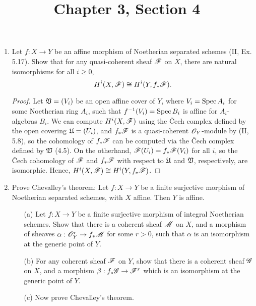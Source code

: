 \documentclass{article}
\title{Chapter 3, Section 4}
\begin{document}
\maketitle
\begin{enumerate} [label=\textbf{\arabic*.}, leftmargin=0em]

\item Let $f : X \to Y$ be an affine morphism of Noetherian separated schemes (II, Ex. 5.17).
Show that for any quasi-coherent sheaf $\mathscr{F}$ on $X$, there are natural isomorphisms for all $i \geq 0$,
\begin{equation*}
  H^i(X, \mathscr{F}) \cong H^i(Y, f_* \mathscr{F}).
\end{equation*}

\begin{proof}
  Let $\mathfrak{V} = (V_i)$ be an open affine cover of $Y$, where $V_i = \operatorname{Spec}{A_i}$ for some Noetherian ring $A_i$, such that $f^{-1}(V_i) = \operatorname{Spec}{B_i}$ is affine for $A_i$-algebras $B_i$.
  We can compute $H^i(X, \mathscr{F})$ using the Čech complex defined by the open covering $\mathfrak{U} = (U_i)$, and $f_*\mathscr{F}$ is a quasi-coherent $\mathscr{O}_Y$-module by (II, 5.8), so the cohomology of $f_*\mathscr{F}$ can be computed via the Čech complex defined by $\mathfrak{V}$ (4.5).
  On the otherhand, $\mathscr{F}(U_i) = f_*\mathscr{F}(V_i)$ for all $i$, so the Čech cohomology of $\mathscr{F}$ and $f_*\mathscr{F}$ with respect to $\mathfrak{U}$ and $\mathfrak{V}$, respectively, are isomorphic.
  Hence, $H^i(X, \mathscr{F}) \cong H^i(Y, f_*\mathscr{F})$.
\end{proof}

\item Prove Chevalley's theorem: Let $f : X \to Y$ be a finite surjective morphism of Noetherian separated schemes, with $X$ affine.
Then $Y$ is affine.
\begin{itemize}
  \item[(a)] Let $f : X \to Y$ be a finite surjective morphism of integral Noetherian schemes.
  Show that there is a coherent sheaf $\mathscr{M}$ on $X$, and a morphism of sheaves $\alpha : \mathscr{O}_Y^r \to f_* \mathscr{M}$ for some $r > 0$, such that $\alpha$ is an isomorphism at the generic point of $Y$.

  \item[(b)] For any coherent sheaf $\mathscr{F}$ on $Y$, show that there is a coherent sheaf $\mathscr{G}$ on $X$, and a morphism $\beta : f_* \mathscr{G} \to \mathscr{F}^r$ which is an isomorphism at the generic point of $Y$. 

  \item[(c)] Now prove Chevalley's theorem.
\end{itemize}


\end{enumerate}
\end{document}
